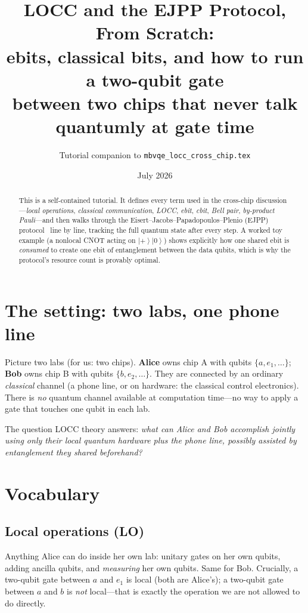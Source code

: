 \documentclass[11pt]{article}
\title{LOCC and the EJPP Protocol, From Scratch:\\
ebits, classical bits, and how to run a two-qubit gate\\ between two chips
that never talk quantumly at gate time}
\author{Tutorial companion to \texttt{mbvqe\_locc\_cross\_chip.tex}}
\date{July 2026}
\newcommand{\ket}[1]{\left|#1\right\rangle}
\begin{document}
\maketitle

\begin{abstract}
This is a self-contained tutorial. It defines every term used in the
cross-chip discussion---\emph{local operations}, \emph{classical
communication}, \emph{LOCC}, \emph{ebit}, \emph{cbit}, \emph{Bell pair},
\emph{by-product Pauli}---and then walks through the
Eisert--Jacobs--Papadopoulos--Plenio (EJPP) protocol~\cite{eisert2000}
line by line, tracking the full quantum state after every step. A worked toy
example (a nonlocal CNOT acting on
$\ket{+}\ket{0}$) shows explicitly how one shared ebit is
\emph{consumed} to create one ebit of entanglement between the data qubits,
which is why the protocol's resource count is provably optimal.
\end{abstract}

\section{The setting: two labs, one phone line}

Picture two labs (for us: two chips).
\textbf{Alice} owns chip A with qubits $\{a, e_1, \dots\}$;
\textbf{Bob} owns chip B with qubits $\{b, e_2, \dots\}$.
They are connected by an ordinary \emph{classical} channel (a phone line, or
on hardware: the classical control electronics). There is \emph{no} quantum
channel available at computation time---no way to apply a gate that touches
one qubit in each lab.

The question LOCC theory answers: \emph{what can Alice and Bob accomplish
jointly using only their local quantum hardware plus the phone line, possibly
assisted by entanglement they shared beforehand?}

\section{Vocabulary}

\subsection{Local operations (LO)}

Anything Alice can do inside her own lab: unitary gates on her own qubits,
adding ancilla qubits, and \emph{measuring} her own qubits. Same for Bob.
Crucially, a two-qubit gate between $a$ and $e_1$ is local (both are
Alice's); a two-qubit gate between $a$ and $b$ is \emph{not} local---that is
exactly the operation we are not allowed to do directly.
\end{document}
